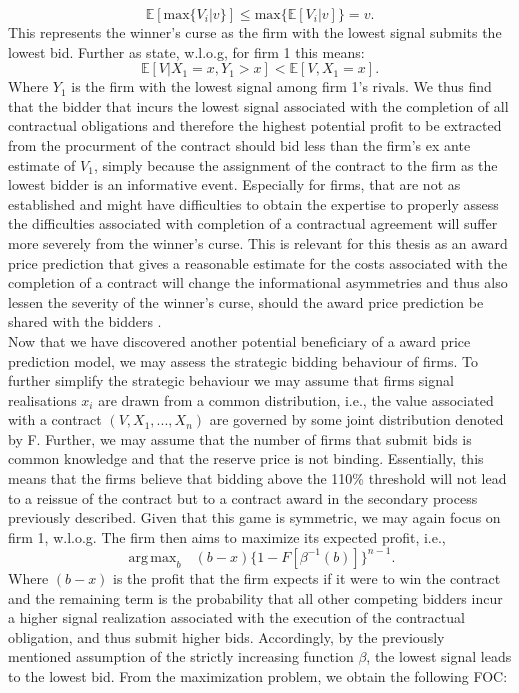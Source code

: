 \documentclass[a4paper,12pt, headsepline]{scrartcl}
\DeclareMathOperator*{\argmaxA}{arg\,max}
\numberwithin{equation}{section}
\begin{document}
\[
\mathbb{E}[\text{max}\{V_i|v\}] \leq \text{max}\{{\mathbb{E}[V_i|v]}\} = v.
\] 
This represents the winner's curse as the firm with the lowest signal submits the lowest bid. Further as \citet{milgrom82} state, w.l.o.g, for firm 1 this means:
\[
\mathbb{E}[V|X_1 = x, Y_1 > x] < \mathbb{E}[V, X_1 = x].
\]
Where $Y_1$ is the firm with the lowest signal among firm 1's rivals. We thus find that the bidder that incurs the lowest signal associated with the completion of all contractual obligations and therefore the highest potential profit to be extracted from the procurment of the contract should bid less than the firm's ex ante estimate of $V_1$, simply because the assignment of the contract to the firm as the lowest bidder is an informative event. Especially for firms, that are not as established and might have difficulties to obtain the expertise to properly assess the difficulties associated with completion of a contractual agreement will suffer more severely from the winner's curse. This is relevant for this thesis as an award price prediction that gives a reasonable estimate for the costs associated with the completion of a contract will change the informational asymmetries and thus also lessen the severity of the winner's curse, should the award price prediction be shared with the bidders \citep{GarciaRodriguez2020}.\\
Now that we have discovered another potential beneficiary of a award price prediction model, we may assess the strategic bidding behaviour of firms. To further simplify the strategic behaviour we may assume that firms signal realisations $x_i$ are drawn from a common distribution, i.e., the value associated with a contract $(V, X_1, ..., X_n)$ are governed by some joint distribution denoted by F. Further, we may assume that the number of firms that submit bids is common knowledge and that the reserve price is not binding. Essentially, this means that the firms believe that bidding above the 110\% threshold will not lead to a reissue of the contract but to a contract award in the secondary process previously described. Given that this game is symmetric, we may again focus on firm 1, w.l.o.g. The firm then aims to maximize its expected profit, i.e.,
\[
\argmaxA_b \text{ } (b - x)\{1 - F[\beta^{-1}(b)]\}^{n-1}.
\]
Where $(b - x)$ is the profit that the firm expects if it were to win the contract and the remaining term is the probability that all other competing bidders incur a higher signal realization associated with the execution of the contractual obligation, and thus submit higher bids. Accordingly, by the previously mentioned assumption of the strictly increasing function $\beta$, the lowest signal leads to the lowest bid. From the maximization problem, we obtain the following FOC:
\end{document}
